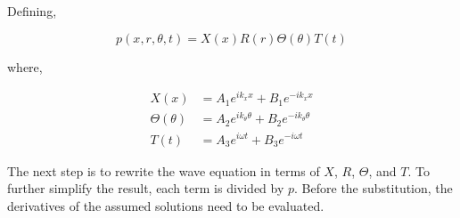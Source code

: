 

Defining,

\begin{equation}
    p(x,r,\theta,t) = X(x) R(r) \Theta(\theta) T(t)
\end{equation}

where, 

\begin{align*}
    X(x) &=
    A_1 e^{ik_x x} +
    B_1 e^{-ik_x x }\\
    \Theta(\theta) &=
    A_2 e^{i k_{\theta} \theta } +
    B_2 e^{-ik_{\theta} \theta }\\
    T(t) &=
    A_3 e^{i \omega t } +
    B_3 e^{-i\omega t  }
\end{align*}

The next step is to rewrite the wave equation in terms of $X$, $R$, $\Theta$,
and $T$. To further simplify the result, each term is divided by $p$.
Before the substitution, the derivatives of the assumed solutions need to be
evaluated.





